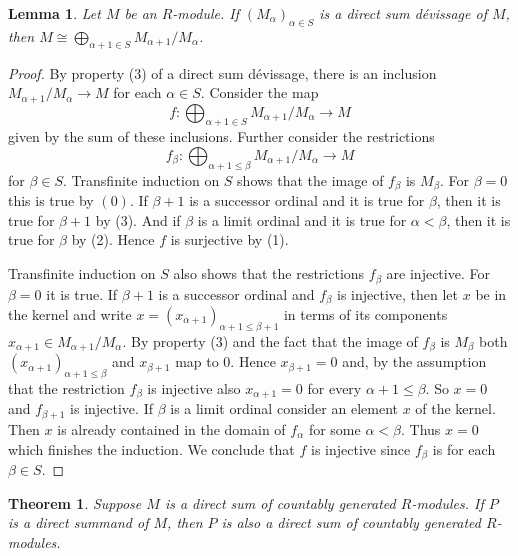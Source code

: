 \documentclass{amsart}
\theoremstyle{plain}
\newtheorem{theorem}[subsection]{Theorem}
\newtheorem{lemma}[subsection]{Lemma}
\theoremstyle{definition}
\theoremstyle{remark}
\numberwithin{equation}{subsection}
\begin{document}
\begin{lemma}
\label{lemma-direct-sum-devissage}
Let $M$ be an $R$-module.  If $(M_{\alpha})_{\alpha \in S}$ is a direct sum
d\'evissage of $M$, then
$M \cong \bigoplus_{\alpha + 1 \in S} M_{\alpha + 1}/M_{\alpha}$.
\end{lemma}

\begin{proof}
By property (3) of a direct sum d\'evissage, there is an inclusion
$M_{\alpha + 1}/M_{\alpha} \to M$ for each $\alpha \in S$.  Consider the
map
$$
f : \bigoplus\nolimits_{\alpha + 1\in S} M_{\alpha + 1}/M_{\alpha} \to M
$$
given by the sum of these inclusions.
Further consider the restrictions
$$
f_{\beta} :
\bigoplus\nolimits_{\alpha + 1 \leq \beta} M_{\alpha + 1}/M_{\alpha}
\longrightarrow
M
$$
for $\beta\in S$. Transfinite induction on $S$ shows that the image of
$f_{\beta}$ is $M_{\beta}$. For $\beta=0$ this is true by $(0)$. If $\beta+1$
is a successor ordinal and it is true for $\beta$, then it is true for 
$\beta + 1$ by (3).  And if $\beta$ is a limit ordinal and it is true for
$\alpha < \beta$, then it is true for $\beta$ by (2). Hence $f$ is surjective
by (1).  

\medskip\noindent
Transfinite induction on $S$ also shows that the restrictions $f_{\beta}$
are injective. For $\beta = 0$ it is true. If $\beta+1$ is a
successor ordinal and $f_{\beta}$ is injective, then let $x$ be in the kernel
and write $x = (x_{\alpha + 1})_{\alpha + 1 \leq \beta + 1}$ in terms of its
components $x_{\alpha + 1} \in M_{\alpha + 1}/M_{\alpha}$.  By property (3) and
the fact that the image of $f_{\beta}$ is $M_{\beta}$ both
$(x_{\alpha + 1})_{\alpha + 1 \leq \beta}$ and $x_{\beta + 1}$ map to $0$.
Hence $x_{\beta+1} = 0$ and, by the assumption that the restriction
$f_{\beta}$ is injective also $x_{\alpha + 1} = 0$
for every $\alpha + 1 \leq \beta$.  So $x = 0$ and $f_{\beta+1}$ is injective.
If $\beta$ is a limit ordinal consider an element $x$ of the kernel. Then $x$
is already contained in the domain of $f_{\alpha}$ for some $\alpha < \beta$.
Thus $x = 0$ which finishes the induction.
We conclude that $f$ is injective since $f_{\beta}$ is for each $\beta \in S$.
\end{proof}


\begin{theorem}
\label{theorem-kaplansky-direct-sum}
Suppose $M$ is a direct sum of countably generated $R$-modules.  If $P$ is a
direct summand of $M$, then $P$ is also a direct sum of countably generated
$R$-modules.
\end{theorem}
\end{document}
